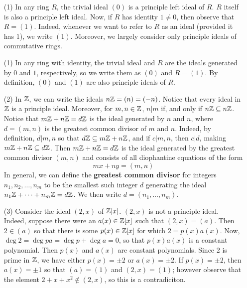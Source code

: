 \begin{example}\label{example_5.13}
  \begin{enumerate}
    \item[(1)] In any ring $R$, the trivial ideal $(0)$ is a principle
      left ideal of $R$. $R$ itself is also a principle left ideal.
      Now, if $R$ has identity $1 \neq 0$, then observe that $R=(1)$.
      Indeed, whenever we want to refer to $R$ as an ideal  (provided
      it has $1$), we write $(1)$. Moreover, we largely consider only
      principle ideals of commutative rings.

    \item[(1)] In any ring with identity, the trivial ideal and
      $R$ are the ideals generated by $0$ and $1$, respectively, so we
      write them as $(0)$ and $R=(1)$. By definition, $(0)$ and $(1)$
      are also principle ideals of $R$.

    \item[(2)] In $\mathbb{Z}$, we can write the ideals  $n\mathbb{Z}=(n)=(-n)$. Notice that
      every ideal in $\mathbb{Z}$ is a principle ideal. Moreover, for $m,n \in
      \mathbb{Z}$, $n|m$ if, and only if  $n\mathbb{Z} \subseteq n\mathbb{Z}$. Notice that
      $m\mathbb{Z}+n\mathbb{Z}=d\mathbb{Z}$ is the ideal generated by $n$ and $n$, where $d=(m,n)$
      is the greatest common divisor of $m$ and  $n$. Indeed, by
      definition, $d|m,n$ so that $d\mathbb{Z} \subseteq m\mathbb{Z}+n\mathbb{Z}$, and if
      $c|m,n$, then  $c|d$, making  $m\mathbb{Z}+n\mathbb{Z} \subseteq d\mathbb{Z}$. Then
      $m\mathbb{Z}+n\mathbb{Z}=d\mathbb{Z}$ is the ideal generated by the greatest common divisor
      $(m,n)$ and consists of all diophantine equations of the form
      \begin{equation*}
        mx+ny=(m,n)
      \end{equation*}
      In general, we can define the \textbf{greatest common divisor} for
      integers $n_1, n_2, \dots, n_m$ to be the smallest such integer $d$
      generating the ideal $n_1\mathbb{Z}+\dots+n_m\mathbb{Z}=d\mathbb{Z}$. We then write
      $d=(n_1, \dots, n_m)$.

    \item[(3)] Consider the ideal $(2,x)$ of $\mathbb{Z}[x]$. $(2,x)$ is not a
      principle ideal. Indeed, suppose there were an $a(x) \in \mathbb{Z}[x]$
      such that $(2,x)=(a)$. Then $2 \in (a)$ so that there is some
      $p(x) \in \mathbb{Z}[x]$ for which $2=p(x)a(x)$. Now,
      $\deg{2}=\deg{pa}=\deg{p}+\deg{a}=0$, so that $p(x)a(x)$ is a
      constant polynomial. Then $p(x)$ and $a(x)$ are constant
      polynomials. Since $2$ is prime in $\mathbb{Z}$, we have either
      $p(x)=\pm{2}$ or $a(x)=\pm{2}$. If $p(x)=\pm{2}$, then
      $a(x)=\pm{1}$ so that $(a)=(1)$ and $(2,x)=(1)$; however
      observe that the element $2+x+x^2 \notin (2,x)$, so this is
      a contradiciton.


\end{enumerate}
\end{example}
